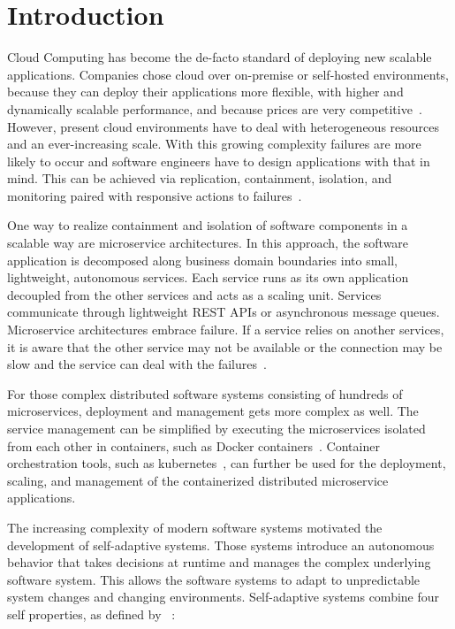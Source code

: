 
\section{Introduction}\label{sec:introduction}
  Cloud Computing has become the de-facto standard of deploying new scalable applications.
  Companies chose cloud over on-premise or self-hosted environments, because they can deploy their applications more flexible, with higher and dynamically scalable performance, and because prices are very competitive~\cite{ToffettiMicroservices}.
  However, present cloud environments have to deal with heterogeneous resources and an ever-increasing scale.
  With this growing complexity failures are more likely to occur and software engineers have to design applications with that in mind.
  This can be achieved via replication, containment, isolation, and monitoring paired with responsive actions to failures~\cite{reactivemanifesto}.

  One way to realize containment and isolation of software components in a scalable way are microservice architectures.
  In this approach, the software application is decomposed along business domain boundaries into small, lightweight, autonomous services.
  Each service runs as its own application decoupled from the other services and acts as a scaling unit.
  Services communicate through lightweight REST APIs or asynchronous message queues.
  Microservice architectures embrace failure.
  If a service relies on another services, it is aware that the other service may not be available or the connection may be slow and the service can deal with the failures~\cite{microservices}.

  For those complex distributed software systems consisting of hundreds of microservices, deployment and management gets more complex as well.
  The service management can be simplified by executing the microservices isolated from each other in containers, such as Docker containers~\cite{docker}.
  Container orchestration tools, such as \gls{kubernetes}~\cite{kubernetes}, can further be used for the deployment, scaling, and management of the containerized distributed microservice applications.

  The increasing complexity of modern software systems motivated the development of self-adaptive systems.
  Those systems introduce an autonomous behavior that takes decisions at runtime and manages the complex underlying software system.
  This allows the software systems to adapt to unpredictable system changes and changing environments.
  Self-adaptive systems combine four self properties, as defined by \citeauthor{Ganek}~\cite{Ganek}:

